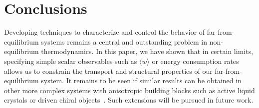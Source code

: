 \documentclass[pre,amsmath,preprintnumbers,10pt,article,notitlepage,twocolumn]{revtex4-1}
\begin{document}
\section{Conclusions}
Developing techniques to characterize and control the behavior of far-from- equilibrium systems remains a central and outstanding problem in non-equilibrium thermodynamics. In this paper, we have shown that in certain limits, specifying simple scalar observables such as $\langle w \rangle$ or energy consumption rates allows us to constrain the transport and structural properties of our far-from-equilibrium system. It remains to be seen if similar results can be obtained in other more complex systems with anisotropic building blocks such as active liquid crystals or driven chiral objects~\cite{Joshi2017,vanZuiden2016,Nguyen2014b}. Such extensions will be pursued in future work.  


\end{document}
